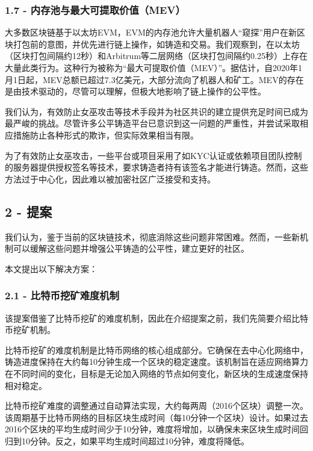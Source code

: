 \documentclass[
]{article}
\begin{document}
\subsubsection{1.7 -
内存池与最大可提取价值（MEV）}\label{ux5185ux5b58ux6c60ux4e0eux6700ux5927ux53efux63d0ux53d6ux4ef7ux503cmev}

大多数区块链基于以太坊EVM，EVM的内存池允许大量机器人``窥探''用户在新区块打包前的意图，并优先进行链上操作，如铸造和交易。我们观察到，在以太坊（区块打包间隔约12秒）和Arbitrum等二层网络（区块打包间隔约0.25秒）上存在大量此类行为。这种行为被称为``最大可提取价值（MEV）''。据估计，自2020年1月1日起，MEV总额已超过7.3亿美元，大部分流向了机器人和矿工。MEV的存在是由技术驱动的，尽管可以理解，但极大地影响了链上操作的公平性。

我们认为，有效防止女巫攻击等技术手段并为社区共识的建立提供充足时间已成为最严峻的挑战。尽管许多公平铸造平台已意识到这一问题的严重性，并尝试采取相应措施防止各种形式的欺诈，但实际效果相当有限。

为了有效防止女巫攻击，一些平台或项目采用了如KYC认证或依赖项目团队控制的服务器提供授权签名等技术，要求铸造者持有该签名才能进行铸造。然而，这些方法过于中心化，因此难以被加密社区广泛接受和支持。

\subsection{2 - 提案}\label{ux63d0ux6848}

我们认为，鉴于当前的区块链技术，彻底消除这些问题非常困难。然而，一些新机制可以缓解这些问题并增强公平铸造的公平性，建立更好的社区。

本文提出以下解决方案：

\subsubsection{2.1 -
比特币挖矿难度机制}\label{ux6bd4ux7279ux5e01ux6316ux77ffux96beux5ea6ux673aux5236}

该提案借鉴了比特币挖矿的难度机制，因此在介绍提案之前，我们先简要介绍比特币挖矿机制。

比特币挖矿的难度机制是比特币网络的核心组成部分。它确保在去中心化网络中，铸造进度保持在大约每10分钟生成一个区块的稳定速度。该机制旨在适应网络算力在不同时间的变化，目标是无论加入网络的节点如何变化，新区块的生成速度保持相对稳定。

比特币挖矿难度的调整通过自动算法实现，大约每两周（2016个区块）调整一次。该周期基于比特币网络的目标区块生成时间（每10分钟一个区块）设计。如果过去2016个区块的平均生成时间少于10分钟，难度将增加，以确保未来区块生成时间回归到10分钟。反之，如果平均生成时间超过10分钟，难度将降低。
\end{document}
